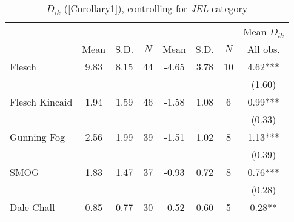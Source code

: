 \begin{table}[H]
    \footnotesize
    \centering
    \begin{threeparttable}
        \caption{\(D_{ik}\) (\autoref{Corollary1}), controlling for \textit{JEL} category}
        \label{table8_jel}
        \begin{tabular}{p{3cm}S[table-format=3.3]@{}S[table-format=3.3]@{}S[table-format=3.2]@{}S[table-format=4.3]@{}S[table-format=3.3]@{}S[table-format=3.1]@{}S@{}}
            \toprule
            &&&{{Mean \(D_{ik}\)}}\\\cmidrule(lr){2-4}\cmidrule(lr){5-7}\cmidrule(lr){8-8}&{{Mean}}&{{S.D.}}&{{\(N\)}}&{{Mean}}&{{S.D.}}&{{\(N\)}}&{{All obs.}}\\
            \midrule
            Flesch                        &        9.83&        8.15&          44&       -4.65&        3.78&          10&        4.62***\\
                                          &            &            &            &            &            &            &      (1.60)   \\
            Flesch Kincaid                &        1.94&        1.59&          46&       -1.58&        1.08&           6&        0.99***\\
                                          &            &            &            &            &            &            &      (0.33)   \\
            Gunning Fog                   &        2.56&        1.99&          39&       -1.51&        1.02&           8&        1.13***\\
                                          &            &            &            &            &            &            &      (0.39)   \\
            SMOG                          &        1.83&        1.47&          37&       -0.93&        0.72&           8&        0.76***\\
                                          &            &            &            &            &            &            &      (0.28)   \\
            Dale-Chall                    &        0.85&        0.77&          30&       -0.52&        0.60&           5&        0.28** \\

\end{tabular}
\end{threeparttable}
\end{table}
